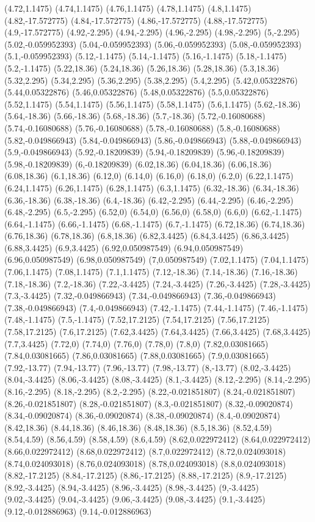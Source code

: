 (4.72,1.1475) (4.74,1.1475) (4.76,1.1475) (4.78,1.1475) (4.8,1.1475) (4.82,-17.572775) (4.84,-17.572775) (4.86,-17.572775) (4.88,-17.572775) (4.9,-17.572775) (4.92,-2.295) (4.94,-2.295) (4.96,-2.295) (4.98,-2.295) (5,-2.295) (5.02,-0.059952393) (5.04,-0.059952393) (5.06,-0.059952393) (5.08,-0.059952393) (5.1,-0.059952393) (5.12,-1.1475) (5.14,-1.1475) (5.16,-1.1475) (5.18,-1.1475) (5.2,-1.1475) (5.22,18.36) (5.24,18.36) (5.26,18.36) (5.28,18.36) (5.3,18.36) (5.32,2.295) (5.34,2.295) (5.36,2.295) (5.38,2.295) (5.4,2.295) (5.42,0.05322876) (5.44,0.05322876) (5.46,0.05322876) (5.48,0.05322876) (5.5,0.05322876) (5.52,1.1475) (5.54,1.1475) (5.56,1.1475) (5.58,1.1475) (5.6,1.1475) (5.62,-18.36) (5.64,-18.36) (5.66,-18.36) (5.68,-18.36) (5.7,-18.36) (5.72,-0.16080688) (5.74,-0.16080688) (5.76,-0.16080688) (5.78,-0.16080688) (5.8,-0.16080688) (5.82,-0.049866943) (5.84,-0.049866943) (5.86,-0.049866943) (5.88,-0.049866943) (5.9,-0.049866943) (5.92,-0.18209839) (5.94,-0.18209839) (5.96,-0.18209839) (5.98,-0.18209839) (6,-0.18209839) (6.02,18.36) (6.04,18.36) (6.06,18.36) (6.08,18.36) (6.1,18.36) (6.12,0) (6.14,0) (6.16,0) (6.18,0) (6.2,0) (6.22,1.1475) (6.24,1.1475) (6.26,1.1475) (6.28,1.1475) (6.3,1.1475) (6.32,-18.36) (6.34,-18.36) (6.36,-18.36) (6.38,-18.36) (6.4,-18.36) (6.42,-2.295) (6.44,-2.295) (6.46,-2.295) (6.48,-2.295) (6.5,-2.295) (6.52,0) (6.54,0) (6.56,0) (6.58,0) (6.6,0) (6.62,-1.1475) (6.64,-1.1475) (6.66,-1.1475) (6.68,-1.1475) (6.7,-1.1475) (6.72,18.36) (6.74,18.36) (6.76,18.36) (6.78,18.36) (6.8,18.36) (6.82,3.4425) (6.84,3.4425) (6.86,3.4425) (6.88,3.4425) (6.9,3.4425) (6.92,0.050987549) (6.94,0.050987549) (6.96,0.050987549) (6.98,0.050987549) (7,0.050987549) (7.02,1.1475) (7.04,1.1475) (7.06,1.1475) (7.08,1.1475) (7.1,1.1475) (7.12,-18.36) (7.14,-18.36) (7.16,-18.36) (7.18,-18.36) (7.2,-18.36) (7.22,-3.4425) (7.24,-3.4425) (7.26,-3.4425) (7.28,-3.4425) (7.3,-3.4425) (7.32,-0.049866943) (7.34,-0.049866943) (7.36,-0.049866943) (7.38,-0.049866943) (7.4,-0.049866943) (7.42,-1.1475) (7.44,-1.1475) (7.46,-1.1475) (7.48,-1.1475) (7.5,-1.1475) (7.52,17.2125) (7.54,17.2125) (7.56,17.2125) (7.58,17.2125) (7.6,17.2125) (7.62,3.4425) (7.64,3.4425) (7.66,3.4425) (7.68,3.4425) (7.7,3.4425) (7.72,0) (7.74,0) (7.76,0) (7.78,0) (7.8,0) (7.82,0.03081665) (7.84,0.03081665) (7.86,0.03081665) (7.88,0.03081665) (7.9,0.03081665) (7.92,-13.77) (7.94,-13.77) (7.96,-13.77) (7.98,-13.77) (8,-13.77) (8.02,-3.4425) (8.04,-3.4425) (8.06,-3.4425) (8.08,-3.4425) (8.1,-3.4425) (8.12,-2.295) (8.14,-2.295) (8.16,-2.295) (8.18,-2.295) (8.2,-2.295) (8.22,-0.021851807) (8.24,-0.021851807) (8.26,-0.021851807) (8.28,-0.021851807) (8.3,-0.021851807) (8.32,-0.09020874) (8.34,-0.09020874) (8.36,-0.09020874) (8.38,-0.09020874) (8.4,-0.09020874) (8.42,18.36) (8.44,18.36) (8.46,18.36) (8.48,18.36) (8.5,18.36) (8.52,4.59) (8.54,4.59) (8.56,4.59) (8.58,4.59) (8.6,4.59) (8.62,0.022972412) (8.64,0.022972412) (8.66,0.022972412) (8.68,0.022972412) (8.7,0.022972412) (8.72,0.024093018) (8.74,0.024093018) (8.76,0.024093018) (8.78,0.024093018) (8.8,0.024093018) (8.82,-17.2125) (8.84,-17.2125) (8.86,-17.2125) (8.88,-17.2125) (8.9,-17.2125) (8.92,-3.4425) (8.94,-3.4425) (8.96,-3.4425) (8.98,-3.4425) (9,-3.4425) (9.02,-3.4425) (9.04,-3.4425) (9.06,-3.4425) (9.08,-3.4425) (9.1,-3.4425) (9.12,-0.012886963) (9.14,-0.012886963) 